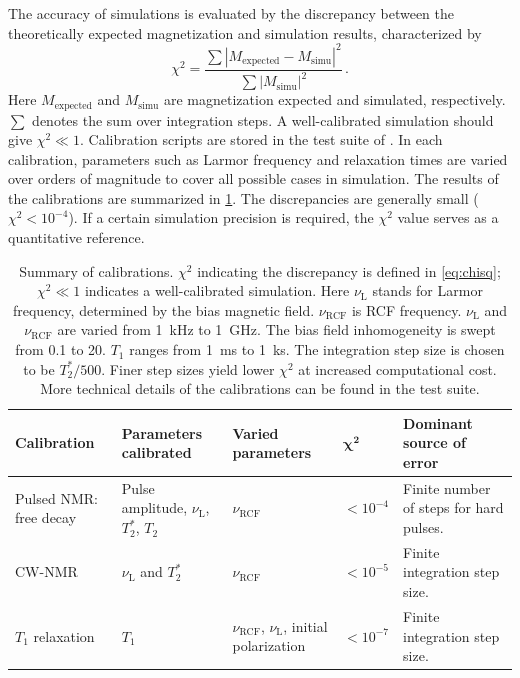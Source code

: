 \documentclass[universe,article,submit,oneauthor]{Definitions/mdpi}
\begin{document}
The accuracy of simulations is evaluated by the discrepancy between the theoretically expected magnetization and simulation results, characterized by
\begin{equation}
    \chi^2 = \dfrac{\sum |M_\mathrm{expected} - M_\mathrm{simu}|^2}{\sum |M_\mathrm{simu}|^2}
    \,. 
    \label{eq:chisq}
\end{equation} 
Here $M_\mathrm{expected}$ and $M_\mathrm{simu}$ are magnetization expected and simulated, respectively. 
$\sum$ denotes the sum over integration steps.
A well-calibrated simulation should give $\chi^2\ll 1$. 
Calibration scripts are stored in the test suite of \axionbloch{}. 
In each calibration, parameters such as Larmor frequency and relaxation times are varied over orders of magnitude to cover all possible cases in simulation.
The results of the calibrations are summarized in \cref{tab:calibration_summary}. 
The discrepancies are generally small ($\chi^2 < 10^{-4}$).
If a certain simulation precision is required, the $\chi^2$ value serves as a quantitative reference. 
\begin{table}
    \caption{Summary of calibrations.
    $\chi^2$ indicating the discrepancy is defined in \cref{eq:chisq}; $\chi^2\ll 1$ indicates a well-calibrated simulation.
    Here $\nu_\mathrm{L}$ stands for Larmor frequency, determined by the bias magnetic field. 
    $\nu_\mathrm{RCF}$ is RCF frequency. 
    $\nu_\mathrm{L}$ and $\nu_\mathrm{RCF}$ are varied from \SI{1}{\kHz} to \SI{1}{\GHz}. The bias field inhomogeneity is swept from \SI{.1}{\ppm} to \SI{20}{\ppm}. 
    $T_1$ ranges from \SI{1}{\ms} to \SI{1}{\kilo\second}. 
    The integration step size is chosen to be $T_2^* / 500$. 
    Finer step sizes yield lower $\chi^2$ at increased computational cost. 
    More technical details of the calibrations can be found in the test suite. 
    }
    \label{tab:calibration_summary}
    \begin{tabularx}{\textwidth}{>{\raggedright\arraybackslash}p{2.5cm} >{\raggedright\arraybackslash}p{3.5cm} >{\raggedright\arraybackslash}p{3.0cm} >{\raggedright\arraybackslash}p{1.2cm} >{\raggedright\arraybackslash}p{5.0cm}}
        \toprule
        \textbf{Calibration} &
        \textbf{Parameters calibrated} &
        \textbf{Varied parameters} &
        $\bm{\chi^2}$ &
        \textbf{Dominant source of error} \\[8pt]
        \midrule
        Pulsed NMR: free decay &
        Pulse amplitude, $\nu_\mathrm{L}$, $T_2^*$, $T_2$ &
        $\nu_\mathrm{RCF}$ &
        $<10^{-4}$ &
        Finite number of steps for hard pulses. \\[8pt]
        CW-NMR &
        $\nu_\mathrm{L}$ and $T_2^*$ &
        $\nu_\mathrm{RCF}$ &
        $<10^{-5}$  &
        Finite integration step size.  \\[8pt]
        $T_1$ relaxation &
        $T_1$ &
        $\nu_\mathrm{RCF}$, $\nu_\mathrm{L}$, initial polarization &
        $<10^{-7}$  & 
        Finite integration step size. \\
        \bottomrule
    \end{tabularx}
\end{table}
\end{document}
